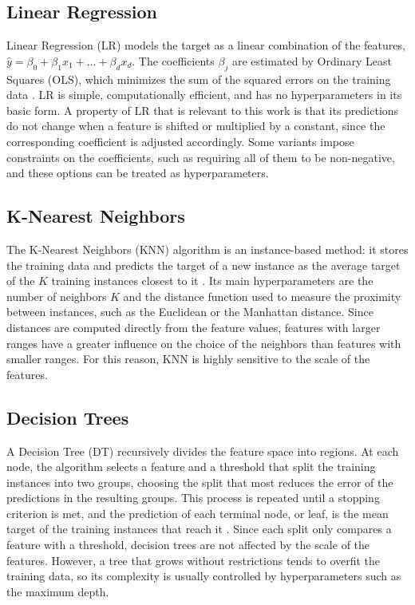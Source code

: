 \subsection{Linear Regression}

Linear Regression (LR) models the target as a linear combination of the
features, $\hat{y} = \beta_0 + \beta_1 x_1 + \dots + \beta_d x_d$. The
coefficients $\beta_j$ are estimated by Ordinary Least Squares (OLS), which
minimizes the sum of the squared errors on the training data \cite{hastie2009}.
LR is simple, computationally efficient, and has no hyperparameters in its basic
form. A property of LR that is relevant to this work is that its predictions do
not change when a feature is shifted or multiplied by a constant, since the
corresponding coefficient is adjusted accordingly. Some variants impose
constraints on the coefficients, such as requiring all of them to be
non-negative, and these options can be treated as hyperparameters.

\subsection{K-Nearest Neighbors}

The K-Nearest Neighbors (KNN) algorithm is an instance-based method: it stores
the training data and predicts the target of a new instance as the average
target of the $K$ training instances closest to it \cite{cover1967,hastie2009}.
Its main hyperparameters are the number of neighbors $K$ and the distance
function used to measure the proximity between instances, such as the
Euclidean or the Manhattan distance. Since distances are computed directly from
the feature values, features with larger ranges have a greater influence on the
choice of the neighbors than features with smaller ranges. For this reason, KNN
is highly sensitive to the scale of the features.

\subsection{Decision Trees}

A Decision Tree (DT) recursively divides the feature space into regions. At each
node, the algorithm selects a feature and a threshold that split the training
instances into two groups, choosing the split that most reduces the error of the
predictions in the resulting groups. This process is repeated until a stopping
criterion is met, and the prediction of each terminal node, or leaf, is the mean
target of the training instances that reach it \cite{breiman1984}. Since each
split only compares a feature with a threshold, decision trees are not affected
by the scale of the features. However, a tree that grows without restrictions
tends to overfit the training data, so its complexity is usually controlled by
hyperparameters such as the maximum depth.

